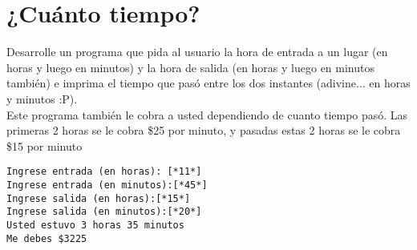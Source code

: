 \section{¿Cuánto tiempo?}
Desarrolle un programa que pida al usuario la hora de entrada a un lugar (en horas y luego en minutos) y la hora de salida (en horas y luego en minutos también) e imprima el tiempo que pasó entre los dos instantes (adivine... en horas y minutos :P).
\\
Este programa también le cobra a usted dependiendo de cuanto tiempo pasó. Las primeras 2 horas se le cobra \$25 por minuto, y pasadas estas 2 horas se le cobra \$15 por minuto
\\
\begin{lstlisting}[style=consola]
Ingrese entrada (en horas): [*11*]
Ingrese entrada (en minutos):[*45*]
Ingrese salida (en horas):[*15*]
Ingrese salida (en minutos):[*20*]
Usted estuvo 3 horas 35 minutos
Me debes $3225
\end{lstlisting} 
